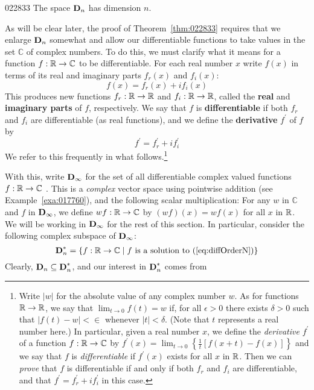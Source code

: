 \begin{theorem}{}{022833}
The space $\textbf{D}_{n}$ has dimension $n$.
\end{theorem}

As will be clear later, the proof of Theorem~\ref{thm:022833} requires that we enlarge $\textbf{D}_{n}$ somewhat and allow our differentiable functions to take values in the set $\mathbb{C}$  of complex numbers. To do this, we must clarify what it means for a function $f : \mathbb{R} \to \mathbb{C}$  to be differentiable. For each real number $x$ write $f(x)$ in terms of its real and imaginary parts $f_{r}(x)$ and $f_{i}(x)$:
\begin{equation*}
f(x) = f_r(x) + if_i(x)
\end{equation*}
This produces new functions $f_{r} : \mathbb{R} \to \mathbb{R}$ and $f_{i} : \mathbb{R} \to \mathbb{R}$, called the \textbf{real} and \textbf{imaginary parts} of $f$, respectively. We say that $f$ is \textbf{differentiable} if both $f_{r}$ and $f_{i}$ are differentiable (as real functions), and we define the \textbf{derivative} $f^\prime$ of $f$ by
\begin{equation}\label{eq:7_4_1differentiable}
f^\prime = f_{r}^\prime + if_{i}^\prime
\end{equation}
We refer to this frequently in what follows.\footnote{Write $|w|$ for the absolute value of any complex number $w$. As for functions $\mathbb{R} \to \mathbb{R}$, we say that $\lim_{t \to 0} f(t) = w$ if, for all $\epsilon > 0$ there exists $\delta > 0$ such that $|f(t) - w| < \in$ whenever $|t| < \delta$. (Note that $t$ represents a real number here.) In particular, given a real number $x$, we define the \textit{derivative} $f^\prime$ of a function $f : \mathbb{R} \to \mathbb{C}$ by $f^\prime(x) = \lim_{t \to 0}\left\lbrace\frac{1}{t}[f(x + t) - f(x)]\right\rbrace$ and we say that $f$ is \textit{differentiable} if $f^\prime(x)$ exists for all $x$ in $\mathbb{R}$. Then we can \textit{prove} that $f$ is differentiable if and only if both $f_{r}$ and $f_{i}$ are differentiable, and that $f^\prime = f_{r}^\prime + if_{i}^{\prime}$ in this case.}

With this, write $\textbf{D}_{\infty}$ for the set of all differentiable complex valued functions $f : \mathbb{R} \to \mathbb{C}$ . This is a \textit{complex} vector space using pointwise addition (see Example~\ref{exa:017760}), and the following scalar multiplication: For any $w$ in $\mathbb{C}$ and $f$ in $\textbf{D}_{\infty}$, we define $wf : \mathbb{R} \to \mathbb{C}$ by $(wf)(x) = wf(x)$ for all $x$ in $\mathbb{R}$. We will be working in $\textbf{D}_{\infty}$ for the rest of this section. In particular, consider the following complex subspace of $\textbf{D}_{\infty}$:
\begin{equation*}
\textbf{D}_{n}^{*} = \{f : \mathbb{R} \to \mathbb{C} \mid f \mbox{ is a solution to (\ref{eq:diffOrderN})}\}
\end{equation*}
Clearly, $\textbf{D}_n \subseteq \textbf{D}_{n}^{*}$, and our interest in $\textbf{D}_{n}^{*}$ comes from

